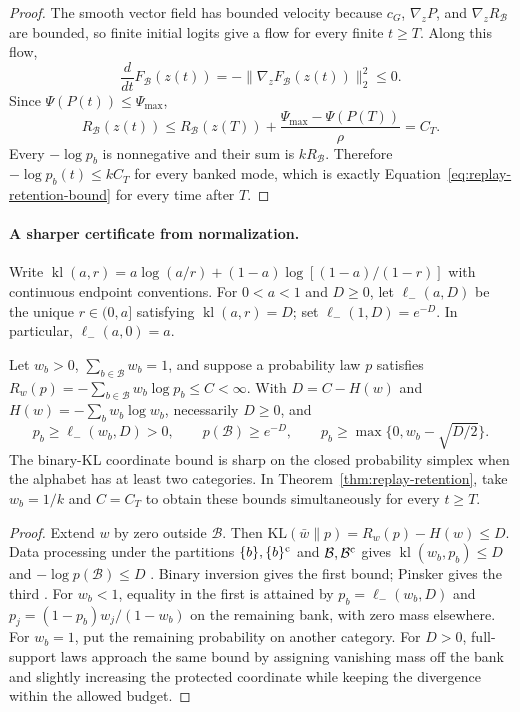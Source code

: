 \begin{proof}
\enforcehalffinalproseline
The smooth vector field has bounded velocity because $c_G$,
$\nabla_zP$, and $\nabla_zR_{\mathcal B}$ are bounded, so finite initial
logits give a flow for every finite $t\ge T$. Along this flow,
\[
  \frac{d}{dt}F_{\mathcal B}(z(t))
  =-\lVert\nabla_zF_{\mathcal B}(z(t))\rVert_2^2\le0.
\]
Since $\Psi(P(t))\le\Psi_{\max}$,
\[
  R_{\mathcal B}(z(t))
  \le R_{\mathcal B}(z(T))
     +\frac{\Psi_{\max}-\Psi(P(T))}{\rho}
  =C_T.
\]
Every $-\log p_b$ is nonnegative and their sum is
$kR_{\mathcal B}$. Therefore
$-\log p_b(t)\le kC_T$ for every banked mode, which is exactly
Equation~\eqref{eq:replay-retention-bound} for every time after $T$.
\end{proof}

\paragraph{A sharper certificate from normalization.}
Write $\operatorname{kl}(a,r)=a\log(a/r)+(1-a)\log[(1-a)/(1-r)]$
with continuous endpoint conventions. For $0<a<1$ and $D\ge0$, let
$\ell_-(a,D)$ be the unique $r\in(0,a]$ satisfying
$\operatorname{kl}(a,r)=D$; set $\ell_-(1,D)=e^{-D}$.
In particular, $\ell_-(a,0)=a$.

\begin{corollary}
\enforcehalffinalproseline
\label{cor:replay-sharp-kl-certificate}
Let $w_b>0$, $\sum_{b\in\mathcal B}w_b=1$, and suppose a probability law
$p$ satisfies $R_w(p)=-\sum_{b\in\mathcal B}w_b\log p_b\le C<\infty$.
With $D=C-H(w)$ and $H(w)=-\sum_bw_b\log w_b$, necessarily $D\ge0$, and
\begin{equation}
 p_b\ge\ell_-(w_b,D)>0,\qquad
 p(\mathcal B)\ge e^{-D},\qquad
 p_b\ge\max\{0,w_b-\sqrt{D/2}\}.
 \label{eq:replay-sharp-kl-certificate}
\end{equation}
The binary-KL coordinate bound is sharp on the closed probability simplex
when the alphabet has at least two categories. In
Theorem~\ref{thm:replay-retention}, take $w_b=1/k$ and $C=C_T$ to obtain
these bounds simultaneously for every $t\ge T$.
\end{corollary}
\begin{proof}
\enforcehalffinalproseline
Extend $w$ by zero outside $\mathcal B$. Then
$\mathrm{KL}(\bar w\|p)=R_w(p)-H(w)\le D$.
Data processing under the partitions $\{b\},\{b\}^{\rm c}$ and
$\mathcal B,\mathcal B^{\rm c}$ gives
$\operatorname{kl}(w_b,p_b)\le D$ and $-\log p(\mathcal B)\le D$
\citep[Theorem~9]{vanerven2014renyi}. Binary inversion gives the first
bound; Pinsker gives the third \citep[Theorem~31]{vanerven2014renyi}.
For $w_b<1$, equality in the first is attained by
$p_b=\ell_-(w_b,D)$ and
$p_j=(1-p_b)w_j/(1-w_b)$ on the remaining bank, with zero mass elsewhere.
For $w_b=1$, put the remaining probability on another category.
For $D>0$, full-support laws approach the same bound by assigning vanishing
mass off the bank and slightly increasing the protected coordinate while
keeping the divergence within the allowed budget.
\end{proof}

